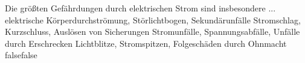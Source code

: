     {Die größten Gefährdungen durch elektrischen Strom sind insbesondere ...}
    {elektrische Körperdurchströmung, Störlichtbogen, Sekundärunfälle}
    {Stromschlag, Kurzschluss, Auslösen von Sicherungen}
    {Stromunfälle, Spannungsabfälle, Unfälle durch Erschrecken}
    {Lichtblitze, Stromspitzen, Folgeschäden durch Ohnmacht}
    {false}{false}